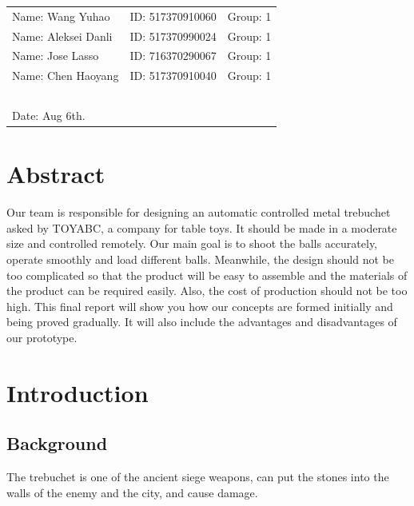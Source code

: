 \documentclass{article}
\begin{document}
\begin{table}[h!]
\flushleft
\begin{tabular}{lll}
Name: Wang Yuhao \hspace*{2em}&
ID: 517370910060\hspace*{2em}
& Group: 1\\
Name: Aleksei Danli \hspace*{2em}&
ID: 517370990024\hspace*{2em}
& Group: 1\\
Name: Jose Lasso \hspace*{2em}&
ID: 716370290067\hspace*{2em}
& Group: 1\\
Name: Chen Haoyang \hspace*{2em}&
ID: 517370910040\hspace*{2em}
& Group: 1\\~\\
Date: Aug 6th.
\hfill
\end{tabular}
\end{table}
\newpage
\tableofcontents


\newpage
\section*{Abstract}
Our team is responsible for designing an automatic controlled metal trebuchet asked by TOYABC, a company for table toys. It should be made in a moderate size and controlled remotely. Our main goal is to shoot the balls accurately, operate smoothly and load different balls. Meanwhile, the design should not be too complicated so that the product will be easy to assemble and the materials of the product can be required easily. Also, the cost of production should not be too high. This final report will show you how our concepts are formed initially and being proved gradually. It will also include the advantages and disadvantages of our prototype.

\section{Introduction}
\subsection{Background}
The trebuchet is one of the ancient siege weapons, can put the stones into the walls of the enemy and the city, and cause damage.
\end{document}
